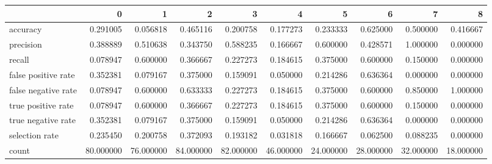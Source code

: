 \begin{tabular}{lrrrrrrrrr}
\toprule
{} &          0 &          1 &          2 &          3 &          4 &          5 &          6 &          7 &          8 \\
\midrule
accuracy            &   0.291005 &   0.056818 &   0.465116 &   0.200758 &   0.177273 &   0.233333 &   0.625000 &   0.500000 &   0.416667 \\
precision           &   0.388889 &   0.510638 &   0.343750 &   0.588235 &   0.166667 &   0.600000 &   0.428571 &   1.000000 &   0.000000 \\
recall              &   0.078947 &   0.600000 &   0.366667 &   0.227273 &   0.184615 &   0.375000 &   0.600000 &   0.150000 &   0.000000 \\
false positive rate &   0.352381 &   0.079167 &   0.375000 &   0.159091 &   0.050000 &   0.214286 &   0.636364 &   0.000000 &   0.000000 \\
false negative rate &   0.078947 &   0.600000 &   0.633333 &   0.227273 &   0.184615 &   0.375000 &   0.600000 &   0.850000 &   1.000000 \\
true positive rate  &   0.078947 &   0.600000 &   0.366667 &   0.227273 &   0.184615 &   0.375000 &   0.600000 &   0.150000 &   0.000000 \\
true negative rate  &   0.352381 &   0.079167 &   0.375000 &   0.159091 &   0.050000 &   0.214286 &   0.636364 &   0.000000 &   0.000000 \\
selection rate      &   0.235450 &   0.200758 &   0.372093 &   0.193182 &   0.031818 &   0.166667 &   0.062500 &   0.088235 &   0.000000 \\
count               &  80.000000 &  76.000000 &  84.000000 &  82.000000 &  46.000000 &  24.000000 &  28.000000 &  32.000000 &  18.000000 \\
\bottomrule
\end{tabular}
